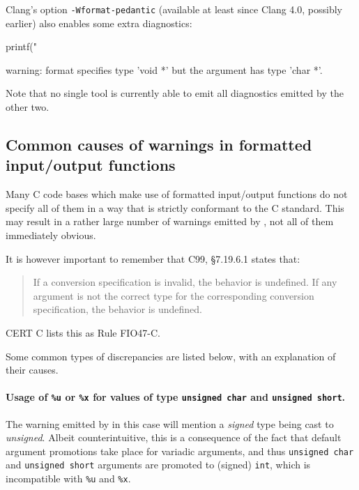 Clang's option \verb+-Wformat-pedantic+ (available at least since Clang 4.0,
possibly earlier) also enables some extra diagnostics:

\begin{ccode}
  printf("%
\end{ccode}

\begin{logs}
  warning: format specifies type 'void *' but the argument has type 'char *'.
\end{logs}

Note that no single tool is currently able to emit all diagnostics emitted
by the other two.

\subsection{Common causes of warnings in formatted input/output functions}

Many C code bases which make use of formatted input/output functions do not
specify all of them in a way that is strictly conformant to the C standard.
This may result in a rather large number of warnings emitted by
, not all of them immediately obvious.

It is however important to remember that C99, §7.19.6.1 states that:

\begin{quote}
  If a conversion specification is invalid, the behavior is undefined.
  If any argument is not the correct type for the corresponding conversion
  specification, the behavior is undefined.
\end{quote}

CERT C lists this as Rule FIO47-C.

Some common types of discrepancies are listed below, with an explanation
of their causes.

\paragraph{Usage of \texttt{\%u} or \texttt{\%x} for values of type
  \texttt{unsigned char} and \texttt{unsigned short}.}

The warning emitted by  in this case will mention a
{\em signed} type being cast to {\em unsigned}.
Albeit counterintuitive, this is a consequence of the fact that default
argument promotions take place for variadic arguments, and thus
\verb+unsigned char+ and \verb+unsigned short+ arguments are promoted to
(signed) \verb+int+, which is incompatible with \verb+%u+ and \verb+%x+.

